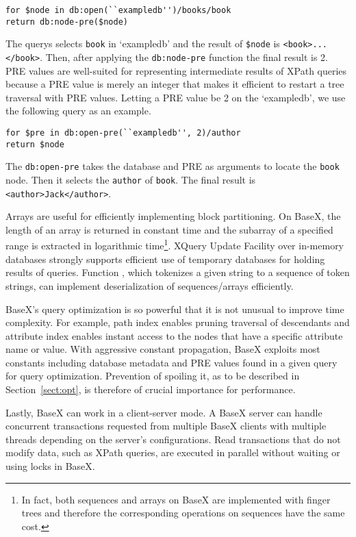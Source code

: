 \begin{lstlisting}
for $node in db:open(``exampledb'')/books/book
return db:node-pre($node)
\end{lstlisting}

The querys selects \texttt{book} in `exampledb' and the result of
\texttt{\$node} is \verb|<book>...</book>|. Then, after applying the
\texttt{db:node-pre} function the final result is 2. PRE values are well-suited
for representing intermediate results of XPath queries because a PRE value is
merely an integer that makes it efficient to restart a tree traversal with PRE
values. Letting a PRE value be 2 on the `exampledb', we use the following query
as an example.

\begin{lstlisting}
for $pre in db:open-pre(``exampledb'', 2)/author
return $node
\end{lstlisting}

The \texttt{db:open-pre} takes the database and PRE as arguments to locate the
\texttt{book} node. Then it selects the \texttt{author} of \texttt{book}. The final
result is \verb|<author>Jack</author>|.


Arrays are useful for efficiently implementing block partitioning. On BaseX, the
length of an array is returned in constant time and the subarray of a specified
range is extracted in logarithmic time\footnote{In fact, both sequences and
arrays on BaseX are implemented with finger trees and therefore the
corresponding operations on sequences have the same cost.}. XQuery Update
Facility over in-memory databases strongly supports efficient use of temporary
databases for holding results of queries. Function , which
tokenizes a given string to a sequence of token strings, can implement
deserialization of sequences/arrays efficiently.  

BaseX's query optimization is so powerful that it is not unusual to improve time
complexity. For example, path index enables pruning traversal of descendants and
attribute index enables instant access to the nodes that have a specific
attribute name or value. With aggressive constant propagation, BaseX exploits
most constants including database metadata and PRE values found in a given query
for query optimization. Prevention of spoiling it, as to be described in
Section~\ref{sect:opt}, is therefore of crucial importance for performance.

Lastly, BaseX can work in a client-server mode. A BaseX server can handle
concurrent transactions requested from multiple BaseX clients with multiple
threads depending on the server's configurations. Read transactions that do not
modify data, such as XPath queries, are executed in parallel without waiting or
using locks in BaseX.
